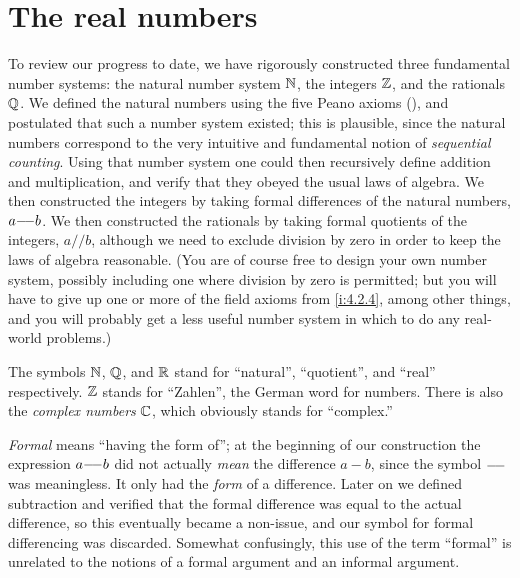 \chapter{The real numbers}\label{i:ch:5}

\begin{note}
  To review our progress to date, we have rigorously constructed three fundamental number systems:
  the natural number system \(\mathbb{N}\), the integers \(\mathbb{Z}\), and the rationals \(\mathbb{Q}\).
  We defined the natural numbers using the five Peano axioms (), and postulated that such a number system existed;
  this is plausible, since the natural numbers correspond to the very intuitive and fundamental notion of \emph{sequential counting}.
  Using that number system one could then recursively define addition and multiplication, and verify that they obeyed the usual laws of algebra.
  We then constructed the integers by taking formal differences of the natural numbers, \(a {-}\!{-} b\).
  We then constructed the rationals by taking formal quotients of the integers, \(a // b\), although we need to exclude division by zero in order to keep the laws of algebra reasonable.
  (You are of course free to design your own number system, possibly including one where division by zero is permitted;
  but you will have to give up one or more of the field axioms from \cref{i:4.2.4}, among other things, and you will probably get a less useful number system in which to do any real-world problems.)
\end{note}

\begin{note}
  The symbols \(\mathbb{N}\), \(\mathbb{Q}\), and \(\mathbb{R}\) stand for ``natural'', ``quotient'', and ``real'' respectively.
  \(\mathbb{Z}\) stands for ``Zahlen'', the German word for numbers.
  There is also the \emph{complex numbers} \(\mathbb{C}\), which obviously stands for ``complex.''
\end{note}

\begin{note}
  \emph{Formal} means ``having the form of'';
  at the beginning of our construction the expression \(a {-}\!{-} b\) did not actually \emph{mean} the difference \(a - b\), since the symbol \({-}\!{-}\) was meaningless.
  It only had the \emph{form} of a difference.
  Later on we defined subtraction and verified that the formal difference was equal to the actual difference, so this eventually became a non-issue, and our symbol for formal differencing was discarded.
  Somewhat confusingly, this use of the term ``formal'' is unrelated to the notions of a formal argument and an informal argument.
\end{note}


